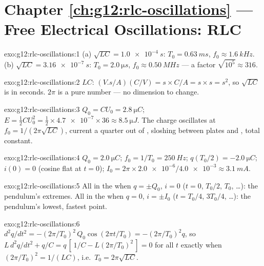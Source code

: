 \section*{Chapter \ref{ch:g12:rlc-oscillations} --- Free Electrical Oscillations: RLC}

\begin{solution}{exo:g12:rlc-oscillations:1}
(a) $\sqrt{LC} = \qty{1.0e-4}{s}$: $T_0 = \qty{0.63}{ms}$,
$f_0 \approx \qty{1.6}{kHz}$. (b) $\sqrt{LC} = \qty{3.16e-7}{s}$:
$T_0 = \qty{2.0}{\micro s}$, $f_0 \approx \qty{0.50}{MHz}$ --- a
factor $\sqrt{10^5} \approx 316$.
\end{solution}

\begin{solution}{exo:g12:rlc-oscillations:2}
$LC$: $(\unit{V.s/A})(\unit{C/V}) = \unit{s} \times \unit{C/A} =
\unit{s} \times \unit{s} = \unit{s^2}$, so $\sqrt{LC}$ is in seconds.
$2\pi$ is a pure number --- no dimension to change.
\end{solution}

\begin{solution}{exo:g12:rlc-oscillations:3}
$Q_0 = CU_0 = \qty{2.8}{\micro C}$; $E = \tfrac12 CU_0^2 =
\tfrac12 \times \num{4.7e-7} \times 36 \approx \qty{8.5}{\micro J}$.
The charge oscillates at $f_0 = 1/(2\pi\sqrt{LC})$, current a quarter
 out of ,  sloshing between plates and , total
constant.
\end{solution}

\begin{solution}{exo:g12:rlc-oscillations:4}
$Q_0 = \qty{2.0}{\micro C}$; $f_0 = 1/T_0 = \qty{250}{Hz}$;
$q(T_0/2) = \qty{-2.0}{\micro C}$; $i(0) = 0$ (cosine flat at $t=0$);
$I_0 = 2\pi \times \num{2.0e-6}/\num{4.0e-3} \approx \qty{3.1}{mA}$.
\end{solution}

\begin{solution}{exo:g12:rlc-oscillations:5}
All in the  when $q = \pm Q_0$, $i = 0$ ($t = 0$, $T_0/2$,
$T_0$, \dots): the pendulum's extremes. All in the  when $q = 0$,
$i = \pm I_0$ ($t = T_0/4$, $3T_0/4$, \dots): the pendulum's lowest,
fastest point.
\end{solution}

\begin{solution}{exo:g12:rlc-oscillations:6}
$d^2q/dt^2 = -(2\pi/T_0)^2\,Q_0\cos(2\pi t/T_0) = -(2\pi/T_0)^2 q$,
so $L\,d^2q/dt^2 + q/C = q\,[\,1/C - L(2\pi/T_0)^2\,] = 0$ for all $t$
exactly when $(2\pi/T_0)^2 = 1/(LC)$, i.e.\ $T_0 = 2\pi\sqrt{LC}$.
\end{solution}

